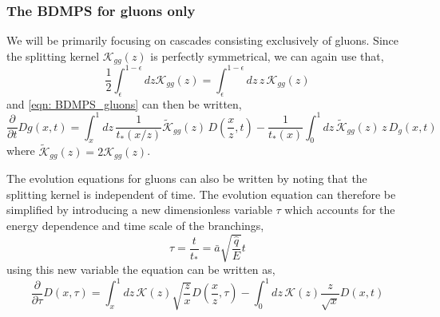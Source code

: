\documentclass[main.tex]{subfiles}
\begin{document}
\subsubsection*{The BDMPS for gluons only}
We will be primarily focusing on cascades consisting exclusively of gluons. Since the splitting kernel \(\mathcal{K}_{gg}(z)\) is perfectly symmetrical, we can again use that, 
\begin{equation}
    \frac{1}{2} \int_\epsilon^{1-\epsilon} dz \mathcal{K}_{gg}(z) = \int_\epsilon^{1-\epsilon} dz\, z\, \mathcal{K}_{gg}(z)
\end{equation}
and \autoref{eqn: BDMPS_gluons} can then be written, 
\begin{equation}\label{eqn: BDMPS_2.8_Blaizot}
    \frac{\partial}{\partial t} Dg(x,t) = \int_x^1 dz\,\frac{1}{t_*(x/z)} \tilde{ \mathcal{K}}_{gg}(z)\, D(\frac{x}{z}, t) - \frac{1}{t_*(x)} \int_0^1 dz\,\tilde{ \mathcal{K}}_{gg}(z) \,z\, D_g(x,t)
\end{equation}
where \(\tilde{\mathcal{K}}_{gg}(z) = 2 \mathcal{K}_{gg}(z)\). 

The evolution equations for gluons can also be written by noting that the splitting kernel is independent of time. The evolution equation can therefore be simplified by introducing a new dimensionless variable \(\tau\) which accounts for the energy dependence and time scale of the branchings, 
\begin{equation}\label{eqn: medium_tau_definiton}
    \tau = \frac{t}{t_*}= \bar a \sqrt{\frac{\hat{q}}{E}} t
\end{equation}
using this new variable the equation can be written as, 
\begin{equation}\label{eqn: BDMPS_solution_startingpoint}
    \frac{\partial}{\partial \tau} D(x, \tau) = \int_x^1 dz \,\mathcal{K}(z) \sqrt{\frac{z}{x}} D(\frac{x}{z}, \tau) - \int_0^1 dz \,\mathcal{K}(z) \frac{z}{\sqrt{x}} D(x,t)
\end{equation}
\end{document}
